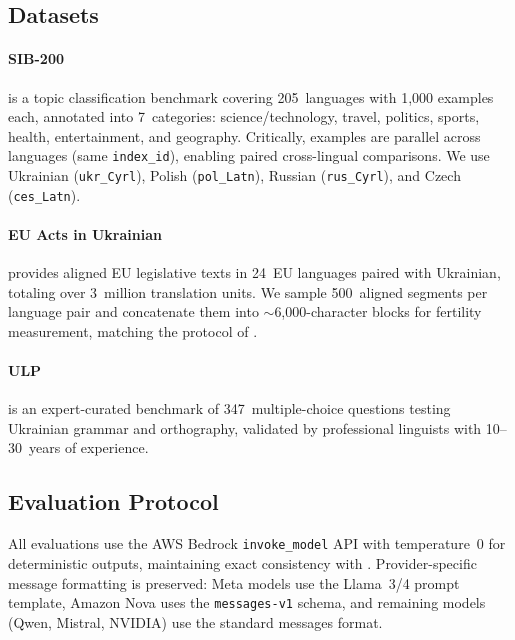 \documentclass[11pt,a4paper]{article}
\begin{document}
\subsection{Datasets}

\paragraph{SIB-200} \citep{adelani2024sib200} is a topic classification benchmark covering 205~languages with 1,000 examples each, annotated into 7~categories: science/technology, travel, politics, sports, health, entertainment, and geography. Critically, examples are parallel across languages (same \texttt{index\_id}), enabling paired cross-lingual comparisons. We use Ukrainian (\texttt{ukr\_Cyrl}), Polish (\texttt{pol\_Latn}), Russian (\texttt{rus\_Cyrl}), and Czech (\texttt{ces\_Latn}).

\paragraph{EU Acts in Ukrainian} \citep{francophonicEU} provides aligned EU legislative texts in 24~EU languages paired with Ukrainian, totaling over 3~million translation units. We sample 500~aligned segments per language pair and concatenate them into ${\sim}$6,000-character blocks for fertility measurement, matching the protocol of \citet{ovcharov2026tokenizer}.

\paragraph{ULP} \citep{galeshchuk2024ulp} is an expert-curated benchmark of 347~multiple-choice questions testing Ukrainian grammar and orthography, validated by professional linguists with 10--30~years of experience.

\subsection{Evaluation Protocol}

All evaluations use the AWS Bedrock \texttt{invoke\_model} API with temperature~0 for deterministic outputs, maintaining exact consistency with \citet{ovcharov2026tokenizer}. Provider-specific message formatting is preserved: Meta models use the Llama~3/4 prompt template, Amazon Nova uses the \texttt{messages-v1} schema, and remaining models (Qwen, Mistral, NVIDIA) use the standard messages format.
\end{document}
